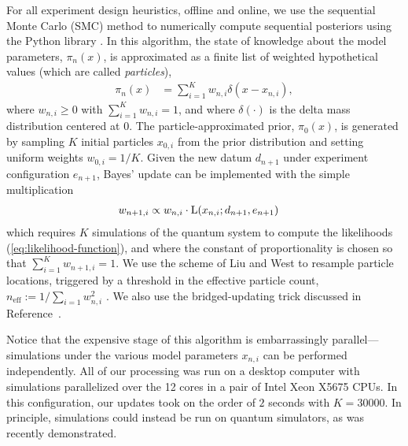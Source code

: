 \documentclass[aps,nofootinbib,twocolumn,superscriptaddress]{revtex4}
\newcommand{\mps}{x}
\newcommand{\eps}{e}
\newcommand{\data}{d}
\begin{document}
For all experiment design heuristics, offline and online, 
we use the sequential Monte Carlo (SMC) \cite{doucet_tutorial_2009} 
method to numerically compute sequential posteriors
using the Python library \qinfer \cite{granade_qinfer:_2017}.
In this algorithm, the state of knowledge about the model 
parameters, $\pi_n(\mps)$, 
is approximated as a finite list of weighted hypothetical values
(which are called \textit{particles}),
\begin{align}
    \pi_n(\mps) 
        &= \sum_{i=1}^{K}w_{n,i} \delta(\mps-\mps_{n,i}),
    \label{eq:particle-approximation}
\end{align}
where $w_{n,i}\geq 0$ with $\sum_{i=1}^K w_{n,i}=1$, and where
$\delta(\cdot)$ is the delta mass distribution centered at $0$.
The particle-approximated prior, $\pi_0(\mps)$, is generated by 
sampling $K$ initial particles $\mps_{0,i}$ from the prior distribution
and setting uniform weights $w_{0,i}=1/K$.
Given the new datum $\data_{n+1}$ under experiment 
configuration $\eps_{n+1}$,
Bayes' update can be implemented with the simple multiplication 
\begin{align}
    w_{n+1,i}
        &\propto w_{n,i}\cdot \Lhood(\mps_{n,i};\data_{n+1},\eps_{n+1})
    \label{eq:particle-update}
\end{align}
which requires $K$ simulations of the quantum system to
compute the likelihoods (\autoref{eq:likelihood-function}), and where
the constant of proportionality is chosen so that 
$\sum_{i=1}^K w_{n+1,i}=1$.
We use the scheme of Liu and West \cite{liu_combined_2001} 
to resample particle locations, 
triggered by a threshold in the effective particle count,
$n_\text{eff}:=1/\sum_{i=1} w_{n,i}^2$ \cite{granade_qinfer:_2017}.
We also use the bridged-updating trick discussed in
Reference~\cite{hincks_statistical_2018}.

Notice that the expensive stage of this algorithm is 
embarrassingly parallel---simulations under the various
model parameters $\mps_{n,i}$ can be performed independently.
All of our processing was run on a desktop computer with simulations
parallelized over the 12 cores in a pair of Intel Xeon X5675 CPUs.
In this configuration, our updates took on the order of $2$ seconds
with $K=30000$.
In principle, simulations could instead be run on quantum simulators, 
as was recently demonstrated\cite{wang_experimental_2017}.
\end{document}
